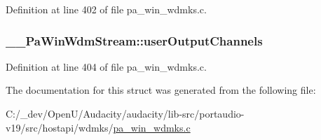 Definition at line 402 of file pa\+\_\+win\+\_\+wdmks.\+c.

\subsubsection[{\texorpdfstring{user\+Output\+Channels}{userOutputChannels}}]{ \+\_\+\+\_\+\+Pa\+Win\+Wdm\+Stream\+::user\+Output\+Channels}\hypertarget{struct_____pa_win_wdm_stream_a4d0bdb5754a747c2be09c7a3829efa9c}{}\label{struct_____pa_win_wdm_stream_a4d0bdb5754a747c2be09c7a3829efa9c}


Definition at line 404 of file pa\+\_\+win\+\_\+wdmks.\+c.



The documentation for this struct was generated from the following file\+:\begin{DoxyCompactItemize}
\item 
C\+:/\+\_\+dev/\+Open\+U/\+Audacity/audacity/lib-\/src/portaudio-\/v19/src/hostapi/wdmks/\hyperlink{pa__win__wdmks_8c}{pa\+\_\+win\+\_\+wdmks.\+c}\end{DoxyCompactItemize}
